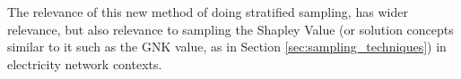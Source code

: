 The relevance of this new method of doing stratified sampling, has wider relevance, but also relevance to sampling the Shapley Value (or solution concepts similar to it such as the GNK value, as in Section \ref{sec:sampling_techniques}) in electricity network contexts.





















